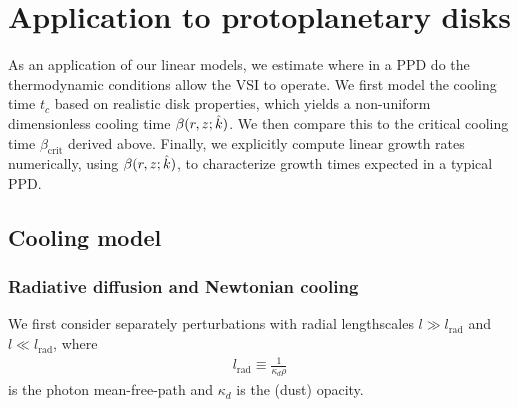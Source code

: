 \section{Application to protoplanetary disks}\label{application} 

As an application of our linear models, we estimate where in a
PPD do the thermodynamic conditions allow the VSI to
operate. We first model the cooling time $t_c$ based on realistic
disk properties, which yields a non-uniform dimensionless cooling
time $\beta(r,z;\hat{k})$. We then compare this to the critical cooling time
$\beta_\mathrm{crit}$ derived above. Finally, we explicitly compute 
linear growth rates numerically, using $\beta(r,z;\hat{k})$, to
characterize growth times expected in a typical PPD.   


\subsection{Cooling model} 

\subsubsection{Radiative diffusion and Newtonian cooling}

We first consider separately perturbations with radial lengthscales
$l\gg l_\mathrm{rad}$ and $l\ll l_\mathrm{rad}$, where       
\begin{align}\label{lrad}
  l_\mathrm{rad} \equiv \frac{1}{\kappa_d\rho} 
\end{align} is the photon mean-free-path and $\kappa_d$ is the (dust)
opacity. 

